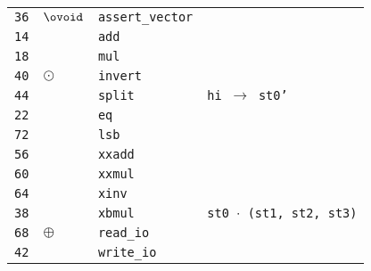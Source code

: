 \documentclass{article}
\makeatletter
\newcommand\incircbin
{\mathpalette\@incircbin}
\newcommand\@incircbin[2]
{\mathbin{\ooalign{\hidewidth$#1#2$\hidewidth\crcr$#1\ovoid$}}}
\newcommand{\ocol}{\incircbin{\raisebox{0.4pt}{:}}}
\newcommand{\shrinkstack}[1]{\tikzmarknode[fill=instr-shrink-stack,circle,inner sep=-1pt]{circ}{#1}}
\newcommand{\hintsplit}{
    \textcolor{hint}{\texttt{hi $\rightarrow$ st0'}}
}
\newcommand{\hintxbmul}{
    \textcolor{hint}{\texttt{st0 $\cdot$ (st1, st2, st3)}}
}
\newcommand{\ssominus}{
    \shrinkstack{\ensuremath{\ominus}}
}
\newcommand{\ssocol}{
    \raisebox{6pt}{\shrinkstack{\raisebox{-6pt}{\ensuremath{\ocol}}}} %
}
\makeatother
\begin{document}
\begin{minipage}{0.3\textwidth}
\begin{tabular}{rlll}
    \texttt{36} & $\ovoid$                         & \texttt{assert\_vector}                            &                \\
    \texttt{14} & \ssocol                          & \texttt{add}                                       &                \\
    \texttt{18} & \ssocol                          & \texttt{mul}                                       &                \\
    \texttt{40} & $\odot$                          & \texttt{invert}                                    &                \\
    \texttt{44} &                                  & \texttt{split}                                     & \hintsplit     \\
    \texttt{22} & \ssocol                          & \texttt{eq}                                        &                \\
    \texttt{72} &                                  & \texttt{lsb}                                       &                \\
    \texttt{56} &                                  & \texttt{xxadd}                                     &                \\
    \texttt{60} &                                  & \texttt{xxmul}                                     &                \\
    \texttt{64} &                                  & \texttt{xinv}                                      &                \\
    \texttt{38} & \shrinkstack{\phantom{$\ovoid$}} & \texttt{xbmul}                                     & \hintxbmul     \\
    \texttt{68} & $\oplus$                         & \texttt{read\_io}                                  &                \\
    \texttt{42} & \ssominus                        & \texttt{write\_io}                                 &
\end{tabular}
\end{minipage}\hfill%
\end{document}
